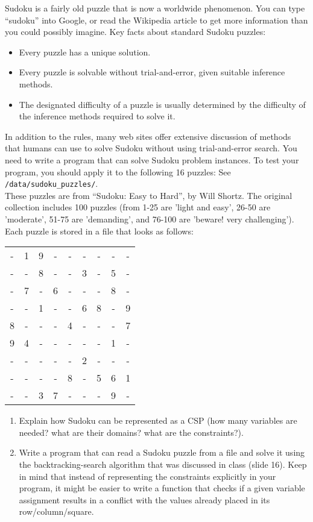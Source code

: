 \documentclass[12pt]{article}
\newenvironment{problem}[2][Problem]{\begin{trivlist}
\item[\hskip \labelsep {\bfseries #1}\hskip \labelsep {\bfseries #2.}]}{\end{trivlist}}
\begin{document}
\begin{problem}{2}
	Sudoku is a fairly old puzzle that is now a worldwide phenomenon.
	You can type ``sudoku'' into Google, or read the Wikipedia article to get more information than you could possibly imagine.
	Key facts about standard Sudoku puzzles:
	\begin{itemize}
		\item Every puzzle has a unique solution.
		\item Every puzzle is solvable without trial-and-error, given suitable inference methods.
		\item The designated difficulty of a puzzle is usually determined by the difficulty of the inference methods required to solve it.
	\end{itemize}
	In addition to the rules, many web sites offer extensive discussion of methods that humans can use to solve Sudoku without using trial-and-error search.
	You need to write a program that can solve Sudoku problem instances. To test your program, you should apply it to the following 16 puzzles:
	See \texttt{/data/sudoku\_puzzles/}. \\
	These puzzles are from ``Sudoku: Easy to Hard'', by Will Shortz.
	The original collection includes 100 puzzles (from 1-25 are 'light and easy', 26-50 are 'moderate', 51-75 are 'demanding', and 76-100 are 'beware! very challenging').
	Each puzzle is stored in a file that looks as follows: \\

	\begin{tabular}{ccccccccc}
		- & 1 & 9 & - & - & - & - & - & - \\
		- & - & 8 & - & - & 3 & - & 5 & - \\
		- & 7 & - & 6 & - & - & - & 8 & - \\
		- & - & 1 & - & - & 6 & 8 & - & 9 \\
		8 & - & - & - & 4 & - & - & - & 7 \\
		9 & 4 & - & - & - & - & - & 1 & - \\
		- & - & - & - & - & 2 & - & - & - \\
		- & - & - & - & 8 & - & 5 & 6 & 1 \\
		- & - & 3 & 7 & - & - & - & 9 & - \\
	\end{tabular}
	\begin{enumerate}
		\item Explain how Sudoku can be represented as a CSP (how many variables are needed? what are their domains? what are the constraints?). 
		\item Write a program that can read a Sudoku puzzle from a file and solve it using the backtracking-search algorithm that was discussed in class (slide 16).
			Keep in mind that instead of representing the constraints explicitly in your program, it might be easier to write a function that checks if a given variable assignment results in a conflict with the values already placed in its row/column/square.


\end{enumerate}
\end{problem}
\end{document}
